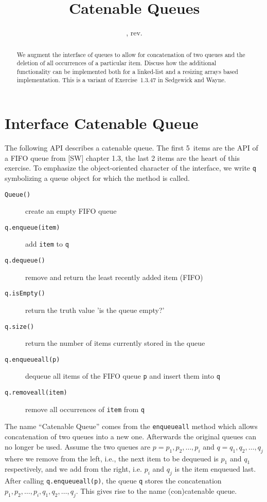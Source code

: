 \documentclass{tufte-handout}
\title{Catenable Queues}
\author{}
\date{\GITAuthorDate, rev. \GITAbrHash}
\begin{document}
\maketitle

\begin{abstract}
  We augment the interface of queues to allow for concatenation of two queues and the deletion of all occurrences of a particular item.
  Discuss how the additional functionality can be implemented both for a linked-list and a resizing arrays based implementation.
  This is a variant of Exercise~1.3.47 in Sedgewick and Wayne.
\end{abstract}

\section{Interface Catenable Queue}

The following API describes a catenable queue. The first 5~items are the API of a FIFO queue from [SW] chapter 1.3, the last 2 items are the heart of this exercise.
To emphasize the object-oriented character of the interface, we write \texttt{q} symbolizing a queue object for which the method is called.
\begin{description}
\item [\texttt{Queue()}] create an empty FIFO queue
\item[\texttt{q.enqueue(item)}] add \texttt{item} to \texttt{q}
\item[\texttt{q.dequeue()}] remove and return the least recently added item (FIFO)
\item[\texttt{q.isEmpty()}] return the truth value 'is the queue empty?'
\item[\texttt{q.size()}] return the number of items currently stored in the queue
\item[\texttt{q.enqueueall(p)}] dequeue all items of the FIFO queue \texttt{p} and insert them into \texttt{q}
\item[\texttt{q.removeall(item)}] remove all occurrences of \texttt{item} from \texttt{q}
\end{description}

The name ``Catenable Queue'' comes from the \texttt{enqueueall} method which allows concatenation of two queues into a new one.
Afterwards the original queues can no longer be used.
Assume the two queues are $p=p_1,p_2,\ldots,p_i$ and $q=q_1,q_2,\ldots,q_j$ where we remove from the left, i.e., the next item to be {dequeued} is $p_1$ and $q_1$ respectively, and we add from the right, i.e. $p_i$ and $q_j$ is the item enqueued last.
After calling \texttt{q.enqueueall(p)}, the queue \texttt{q} stores the concatenation $p_1,p_2,\ldots,p_i,q_1,q_2,\ldots,q_j$.
This gives rise to the name (con)catenable queue.
\end{document}
